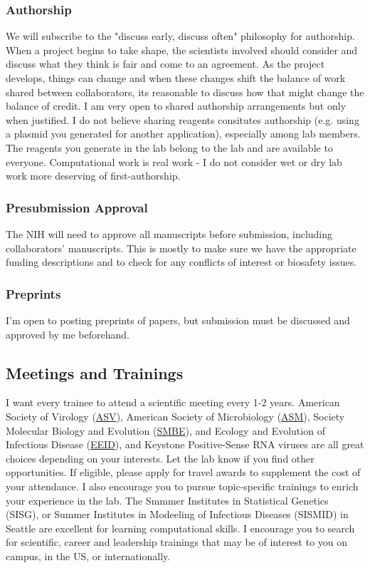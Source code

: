 \documentclass[10pt, a4paper, twocolumn]{article} %
\begin{document}
\subsubsection{Authorship}
We will subscribe to the "discuss early, discuss often" philosophy for authorship. When a project begins to take shape, the scientists involved should consider and discuss what they think is fair and come to an agreement. As the project develops, things can change and when these changes shift the balance of work shared between collaborators, its reasonable to discuss how that might change the balance of credit. I am very open to shared authorship arrangements but only when justified. I do not believe sharing reagents consitutes authorship (e.g. using a plasmid you generated for another application), especially among lab members. The reagents you generate in the lab belong to the lab and are available to everyone. Computational work is real work - I do not consider wet or dry lab work more deserving of first-authorship.
\subsubsection{Presubmission Approval}
The NIH will need to approve all manuscripts before submission, including collaborators' manuscripts. This is mostly to make sure we have the appropriate funding descriptions and to check for any conflicts of interest or biosafety issues.
\subsubsection{Preprints}
I'm open to posting preprints of papers, but submission must be discussed and approved by me beforehand.
\subsection{Meetings and Trainings}
I want every trainee to attend a scientific meeting every 1-2 years. American Society of Virology (\href{https://asv.org/}{ASV}), American Society of Microbiology (\href{https://asm.org/}{ASM}), Society Molecular Biology and Evolution (\href{https://smbe.org/smbe/}{SMBE}), and Ecology and Evolution of Infectious Disease (\href{https://www.eeidconference2021.org/}{EEID}), and Keystone Positive-Sense RNA viruses are all great choices depending on your interests. Let the lab know if you find other opportunities. If eligible, please apply for travel awards to supplement the cost of your attendance.\newline
I also encourage you to pursue topic-specific trainings to enrich your experience in the lab. The Smmmer Institutes in Statistical Genetics (SISG), or Summer Institutes in Modeeling of Infectious Diseases (SISMID) in Seattle are excellent for learning computational skills. I encourage you to search for scientific, career and leadership trainings that may be of interest to you on campus, in the US, or internationally.
\end{document}
